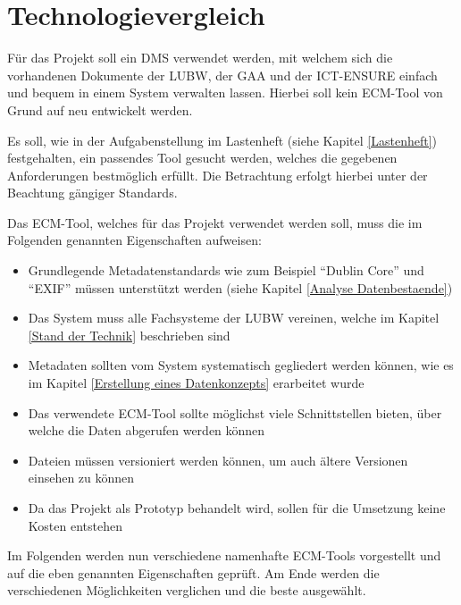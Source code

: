 \section{Technologievergleich}\label{Technologievergleich}
F\"ur das Projekt soll ein \ac{DMS} verwendet werden, mit welchem sich die vorhandenen Dokumente der \ac{LUBW}, der \ac{GAA} und der \ac{ICT-ENSURE} einfach und bequem in einem System verwalten lassen. Hierbei soll kein \ac{ECM}-Tool von Grund auf neu entwickelt werden. 

Es soll, wie in der Aufgabenstellung im Lastenheft (siehe Kapitel \ref{Lastenheft}) festgehalten, ein passendes Tool gesucht werden, welches die gegebenen Anforderungen bestm\"oglich erf\"ullt. Die Betrachtung erfolgt hierbei unter der Beachtung g\"angiger Standards.

Das \ac{ECM}-Tool, welches f\"ur das Projekt verwendet werden soll, muss die im Folgenden genannten Eigenschaften aufweisen:

\begin{itemize}
 \item Grundlegende Metadatenstandards wie zum Beispiel "`Dublin Core"' und "`EXIF"' m\"ussen unterst\"utzt werden (siehe Kapitel \ref{Analyse Datenbestaende})
 \item Das System muss alle Fachsysteme der \ac{LUBW} vereinen, welche im Kapitel \ref{Stand der Technik} beschrieben sind
 \item Metadaten sollten vom System systematisch gegliedert werden k\"onnen, wie es im Kapitel \ref{Erstellung eines Datenkonzepts} erarbeitet wurde
 \item Das verwendete \ac{ECM}-Tool sollte m\"oglichst viele Schnittstellen bieten, \"uber welche die Daten abgerufen werden k\"onnen
 \item Dateien m\"ussen versioniert werden k\"onnen, um auch \"altere Versionen einsehen zu k\"onnen
 \item Da das Projekt als Prototyp behandelt wird, sollen f\"ur die Umsetzung keine Kosten entstehen
\end{itemize}

Im Folgenden werden nun verschiedene namenhafte \ac{ECM}-Tools vorgestellt und auf die eben genannten Eigenschaften gepr\"uft. Am Ende werden die verschiedenen M\"oglichkeiten verglichen und die beste ausgew\"ahlt.



